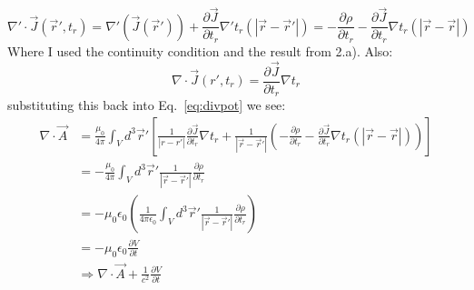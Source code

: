 \documentclass[a4paper,12pt]{article}
\begin{document}
\begin{minipage}[t]{0.9\textwidth}
\begin{minipage}[t]{\textwidth}
\begin{equation*}
      \nabla' \cdot \vec{J}(\vec{r}', t_r) = \nabla' \left(\vec{J}(\vec{r}') \right) + \frac{\partial \vec{J}}{\partial t_r} \nabla ' t_r(|\vec{r} - \vec{r}'|) = - \frac{\partial \rho}{\partial t_r} -  \frac{\partial \vec{J}}{\partial t_r} \nabla t_r(|\vec{r} - \vec{r}|)
    \end{equation*}
    Where I used the continuity condition and the result from 2.a).
    Also:
    \begin{equation*}
      \nabla \cdot \vec{J}(r',t_r) = \frac{\partial \vec{J}}{\partial t_r} \nabla t_r
    \end{equation*}
    substituting this back into Eq.~\ref{eq:divpot} we see:
    \begin{align*}
      \nabla \cdot\vec{A} &= \frac{\mu_0}{4\pi} \int_V d^3\vec{r}' \left[\frac{1}{|r - r'|} \frac{\partial \vec{J}}{\partial t_r} \nabla t_r + \frac{1}{|\vec{r} - \vec{r}'|}\left(-\frac{\partial \rho}{\partial t_r} -  \frac{\partial \vec{J}}{\partial t_r} \nabla t_r(|\vec{r} - \vec{r}|)\right) \right]\\
                          &= -\frac{\mu_0}{4\pi} \int_V d^3\vec{r}' \frac{1}{|\vec{r} - \vec{r}'|}\frac{\partial \rho}{\partial t_r} \\
                          &= -\mu_0\epsilon_0\left(\frac{1}{4\pi\epsilon_0} \int_V d^3\vec{r}' \frac{1}{|\vec{r} - \vec{r}'|}\frac{\partial \rho}{\partial t_r} \right)\\
                          &= -\mu_0\epsilon_0\frac{\partial V}{\partial t} \\
                          &\Rightarrow \nabla \cdot\vec{A} + \frac{1}{c^2} \frac{\partial V}{\partial t}
    \end{align*}
  \end{minipage}
\end{minipage}
\end{document}
